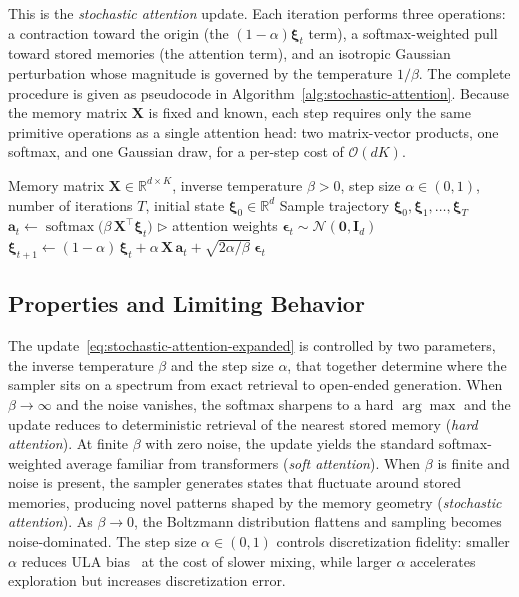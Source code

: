 This is the \emph{stochastic attention} update. Each iteration performs three operations: a contraction toward the origin (the $(1-\alpha)\boldsymbol{\xi}_t$ term), a softmax-weighted pull toward stored memories (the attention term), and an isotropic Gaussian perturbation whose magnitude is governed by the temperature $1/\beta$. The complete procedure is given as pseudocode in Algorithm~\ref{alg:stochastic-attention}. Because the memory matrix $\mathbf{X}$ is fixed and known, each step requires only the same primitive operations as a single attention head: two matrix-vector products, one softmax, and one Gaussian draw, for a per-step cost of $\mathcal{O}(dK)$.


\begin{algorithm}[t]
\caption{Stochastic Attention Sampler}\label{alg:stochastic-attention}
\begin{algorithmic}[1]
\REQUIRE Memory matrix $\mathbf{X}\in\mathbb{R}^{d\times K}$, inverse temperature $\beta>0$, step size $\alpha\in(0,1)$, number of iterations $T$, initial state $\boldsymbol{\xi}_0\in\mathbb{R}^d$
\ENSURE Sample trajectory $\boldsymbol{\xi}_0,\boldsymbol{\xi}_1,\dots,\boldsymbol{\xi}_T$
    \STATE $\mathbf{a}_t \leftarrow \operatorname{softmax}\!\bigl(\beta\,\mathbf{X}^{\top}\boldsymbol{\xi}_t\bigr)$ \hfill $\triangleright$ attention weights
    \STATE $\boldsymbol{\epsilon}_t \sim \mathcal{N}(\mathbf{0},\mathbf{I}_d)$
    \STATE $\boldsymbol{\xi}_{t+1} \leftarrow (1-\alpha)\,\boldsymbol{\xi}_t + \alpha\,\mathbf{X}\,\mathbf{a}_t + \sqrt{2\alpha/\beta}\;\boldsymbol{\epsilon}_t$
\ENDFOR
\end{algorithmic}
\end{algorithm}

\subsection{Properties and Limiting Behavior}
The update~\eqref{eq:stochastic-attention-expanded} is controlled by two parameters, the inverse temperature $\beta$ and the step size $\alpha$, that together determine where the sampler sits on a spectrum from exact retrieval to open-ended generation. When $\beta\to\infty$ and the noise vanishes, the softmax sharpens to a hard $\arg\max$ and the update reduces to deterministic retrieval of the nearest stored memory (\emph{hard attention}). At finite $\beta$ with zero noise, the update yields the standard softmax-weighted average familiar from transformers (\emph{soft attention}). When $\beta$ is finite and noise is present, the sampler generates states that fluctuate around stored memories, producing novel patterns shaped by the memory geometry (\emph{stochastic attention}). As $\beta\to 0$, the Boltzmann distribution flattens and sampling becomes noise-dominated. The step size $\alpha\in(0,1)$ controls discretization fidelity: smaller $\alpha$ reduces ULA bias~\cite{durmusNonasymptoticAnalysisUnadjusted2017} at the cost of slower mixing, while larger $\alpha$ accelerates exploration but increases discretization error.

